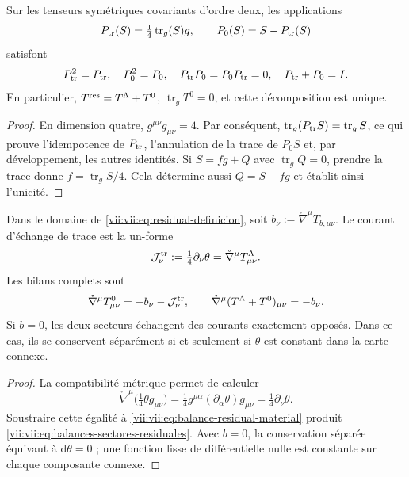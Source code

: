 \begin{proposition}
\label{vii:vii:prop:proyectores-traza-residual}
Sur les tenseurs symétriques covariants d'ordre deux, les applications
\[
 P_{\rm tr}(S)=\tfrac14\operatorname{tr}_g(S)g,
 \qquad P_0(S)=S-P_{\rm tr}(S)
\]
satisfont
\begin{equation}
 P_{\rm tr}^2=P_{\rm tr},\quad P_0^2=P_0,\quad
 P_{\rm tr}P_0=P_0P_{\rm tr}=0,\quad P_{\rm tr}+P_0=I.
 \label{vii:vii:eq:proyectores-traza-residual}
\end{equation}
En particulier, \(T^{\rm res}=T^\Lambda+T^0\), \(\operatorname{tr}_gT^0=0\), et cette décomposition est unique.
\end{proposition}
\begin{proof}
En dimension quatre, \(g^{\mu\nu}g_{\mu\nu}=4\). Par conséquent,
\(\operatorname{tr}_g(P_{\rm tr}S)=\operatorname{tr}_gS\), ce qui
prouve l'idempotence de \(P_{\rm tr}\), l'annulation de la trace
de \(P_0S\) et, par développement, les autres identités.
Si \(S=fg+Q\) avec \(\operatorname{tr}_gQ=0\), prendre la trace
donne \(f=\operatorname{tr}_gS/4\). Cela détermine aussi
\(Q=S-fg\) et établit ainsi l'unicité.
\end{proof}

\begin{theorem}
\label{vii:vii:thm:intercambio-traza-residual}
Dans le domaine de \eqref{vii:vii:eq:residual-definicion}, soit
\(b_\nu:=\mathring\nabla^\mu T_{b,\mu\nu}\). Le courant
d'échange de trace est la un-forme
\begin{equation}
 \mathcal J^{\rm tr}_\nu
 :=\tfrac14\partial_\nu\theta
 =\mathring\nabla^\mu T^\Lambda_{\mu\nu}.
 \label{vii:vii:eq:corriente-intercambio-traza}
\end{equation}
Les bilans complets sont
\begin{equation}
 \mathring\nabla^\mu T^0_{\mu\nu}
       =-b_\nu-\mathcal J^{\rm tr}_\nu,
 \qquad
 \mathring\nabla^\mu(T^\Lambda+T^0)_{\mu\nu}=-b_\nu.
 \label{vii:vii:eq:balances-sectores-residuales}
\end{equation}
Si \(b=0\), les deux secteurs échangent des courants exactement opposés. Dans ce cas, ils se conservent séparément si et seulement si \(\theta\) est constant dans la carte connexe.
\end{theorem}
\begin{proof}
La compatibilité métrique permet de calculer
\[
 \mathring\nabla^\mu\bigl(\tfrac14\theta g_{\mu\nu}\bigr)
 =\tfrac14g^{\mu\alpha}(\partial_\alpha\theta)g_{\mu\nu}
 =\tfrac14\partial_\nu\theta.
\]
Soustraire cette égalité à \eqref{vii:vii:eq:balance-residual-material} produit
\eqref{vii:vii:eq:balances-sectores-residuales}. Avec \(b=0\), la
conservation séparée équivaut à \(\mathrm d\theta=0\) ; une fonction
lisse de différentielle nulle est constante sur chaque composante connexe.
\end{proof}

